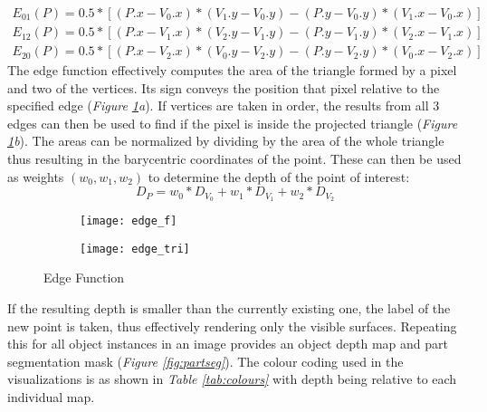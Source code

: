 \documentclass[main.tex]{subfiles}
\begin{document}
\begin{align}
E_{01}(P) = 0.5 * [(P.x - V_0.x) * (V_1.y - V_0.y) - (P.y - V_0.y) * (V_1.x - V_0.x)] \\
E_{12}(P) = 0.5 * [(P.x - V_1.x) * (V_2.y - V_1.y) - (P.y - V_1.y) * (V_2.x - V_1.x)] \\
E_{20}(P) = 0.5 * [(P.x - V_2.x) * (V_0.y - V_2.y) - (P.y - V_2.y) * (V_0.x - V_2.x)]
\end{align}
\indent The edge function effectively computes the area of the triangle formed by a pixel and two of the vertices. Its sign conveys the position that pixel relative to the specified edge (\emph{Figure \ref{fig:edgefunc}a}). If vertices are taken in order, the results from all 3 edges can then be used to find if the pixel is inside the projected triangle (\emph{Figure \ref{fig:edgefunc}b}). The areas can be normalized by dividing by the area of the whole triangle thus resulting in the barycentric coordinates of the point. These can then be used as weights $(w_0,w_1,w_2)$ to determine the depth of the point of interest:
\begin{equation}
D_P = w_0 * D_{V_{0}} + w_1 * D_{V_{1}} + w_2 * D_{V_{2}}
\end{equation} 
\begin{figure}[h]
\centering
\begin{subfigure}[c]{0.3\textwidth}
\centering
\texttt{[image: edge\_f]}
\caption{}
\end{subfigure}%
\hspace*{4cm}%
\begin{subfigure}[c]{0.3\textwidth}
\centering
\texttt{[image: edge\_tri]}
\caption{}
\end{subfigure}%
\caption{Edge Function \cite{Rast2020}}
\label{fig:edgefunc}
\end{figure}
If the resulting depth is smaller than the currently existing one, the label of the new point is taken, thus effectively rendering only the visible surfaces. Repeating this for all object instances in an image provides an object depth map and part segmentation mask (\emph{Figure \ref{fig:partseg}}). The colour coding used in the visualizations is as shown in \emph{Table \ref{tab:colours}} with depth being relative to each individual map.
\end{document}
